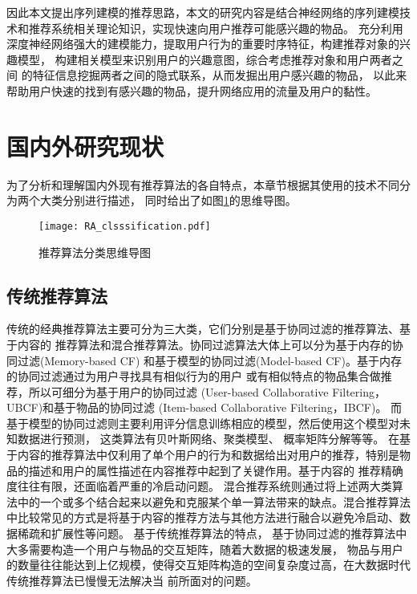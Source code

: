 因此本文提出序列建模的推荐思路，本文的研究内容是结合神经网络的序列建模技术和推荐系统相关理论知识，实现快速向用户推荐可能感兴趣的物品。%
充分利用深度神经网络强大的建模能力，提取用户行为的重要时序特征，构建推荐对象的兴趣模型，%
构建相关模型来识别用户的兴趣意图，综合考虑推荐对象和用户两者之间%
的特征信息挖掘两者之间的隐式联系，从而发掘出用户感兴趣的物品，
以此来帮助用户快速的找到有感兴趣的物品，提升网络应用的流量及用户的黏性。%

%

\section{国内外研究现状}

为了分析和理解国内外现有推荐算法的各自特点，本章节根据其使用的技术不同分为两个大类分别进行描述，
同时给出了如图\ref{fig:RA_clsssification}的思维导图。

\begin{figure}[htb]
  \centering
  \texttt{[image: RA\_clsssification.pdf]}\\
  \caption{推荐算法分类思维导图}
  \label{fig:RA_clsssification}
\end{figure}

\subsection{传统推荐算法}

传统的经典推荐算法主要可分为三大类，它们分别是基于协同过滤的推荐算法、基于内容的%
推荐算法和混合推荐算法。协同过滤算法大体上可以分为基于内存的协同过滤(Memory-based CF)%
和基于模型的协同过滤(Model-based CF)。基于内存的协同过滤通过为用户寻找具有相似行为的用户%
或有相似特点的物品集合做推荐，所以可细分为基于用户的协同过滤%
(User-based Collaborative Filtering，UBCF)和基于物品的协同过滤%
(Item-based Collaborative Filtering，IBCF)。
而基于模型的协同过滤则主要利用评分信息训练相应的模型，然后使用这个模型对未知数据进行预测，%
这类算法有贝叶斯网络、聚类模型、%
概率矩阵分解等等。
在基于内容的推荐算法中仅利用了单个用户的行为和数据给出对用户的推荐，特别是物品的描述和用户的属性描述在内容推荐中起到了关键作用。基于内容的
推荐精确度往往有限，还面临着严重的冷启动问题。
混合推荐系统则通过将上述两大类算法中的一个或多个结合起来以避免和克服某个单一算法带来的缺点。混合推荐算法中比较常见的方式是将基于内容的推荐方法与其他方法进行融合以避免冷启动、数据稀疏和扩展性等问题。
基于传统推荐算法的特点，%
基于协同过滤的推荐算法中大多需要构造一个用户与物品的交互矩阵，随着大数据的极速发展，%
物品与用户的数量往往能达到上亿规模，使得交互矩阵构造的空间复杂度过高，在大数据时代传统推荐算法已慢慢无法解决当%
前所面对的问题。

